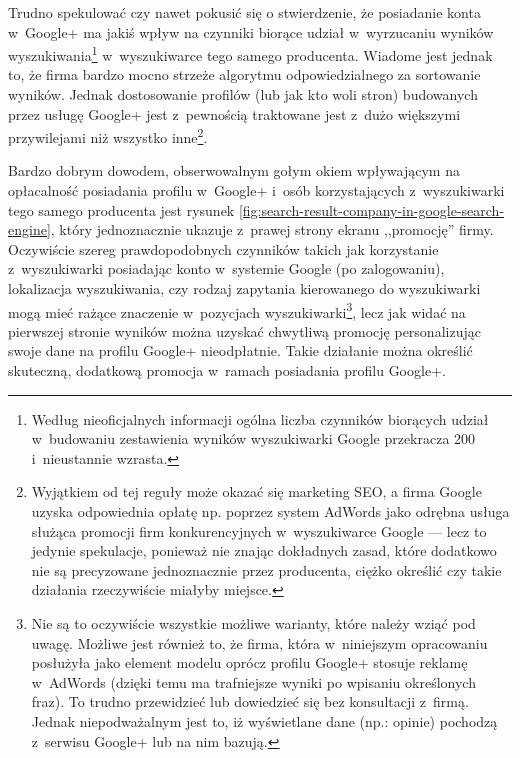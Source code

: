 Trudno spekulować czy nawet pokusić się o stwierdzenie, że posiadanie konta w~Google+ ma jakiś wpływ na czynniki biorące udział w~wyrzucaniu wyników wyszukiwania\footnote{Według nieoficjalnych informacji ogólna liczba czynników biorących udział w~budowaniu zestawienia wyników wyszukiwarki Google przekracza 200 i~nieustannie wzrasta.} w~wyszukiwarce tego samego producenta. Wiadome jest jednak to, że firma bardzo mocno strzeże algorytmu odpowiedzialnego za sortowanie wyników. Jednak dostosowanie profilów (lub jak kto woli stron) budowanych przez usługę Google+ jest z~pewnością traktowane jest z~dużo większymi przywilejami niż wszystko inne\footnote{Wyjątkiem od tej reguły może okazać się marketing SEO, a firma Google uzyska odpowiednia opłatę np. poprzez system AdWords jako odrębna usługa służąca promocji firm konkurencyjnych w~wyszukiwarce Google --- lecz to jedynie spekulacje, ponieważ nie znając dokładnych zasad, które dodatkowo nie są precyzowane jednoznacznie przez producenta, ciężko określić czy takie działania rzeczywiście miałyby miejsce.}.

Bardzo dobrym dowodem, obserwowalnym gołym okiem wpływającym na opłacalność posiadania profilu w~Google+ i~osób korzystających z~wyszukiwarki tego samego producenta jest rysunek \ref{fig:search-result-company-in-google-search-engine}, który jednoznacznie ukazuje z~prawej strony ekranu ,,promocję'' firmy. Oczywiście szereg prawdopodobnych czynników takich jak korzystanie z~wyszukiwarki posiadając konto w~systemie Google (po zalogowaniu), lokalizacja wyszukiwania, czy rodzaj zapytania kierowanego do wyszukiwarki mogą mieć rażące znaczenie w~pozycjach wyszukiwarki\footnote{Nie są to oczywiście wszystkie możliwe warianty, które należy wziąć pod uwagę. Możliwe jest również to, że firma, która w~niniejszym opracowaniu posłużyła jako element modelu oprócz profilu Google+ stosuje reklamę w~AdWords (dzięki temu ma trafniejsze wyniki po wpisaniu określonych fraz). To trudno przewidzieć lub dowiedzieć się bez konsultacji z~firmą. Jednak niepodważalnym jest to, iż wyświetlane dane (np.: opinie) pochodzą z~serwisu Google+ lub na nim bazują.}, lecz jak widać na pierwszej stronie wyników można uzyskać chwytliwą promocję personalizując swoje dane na profilu Google+ nieodpłatnie. Takie działanie można określić skuteczną, dodatkową promocja w~ramach posiadania profilu Google+.

